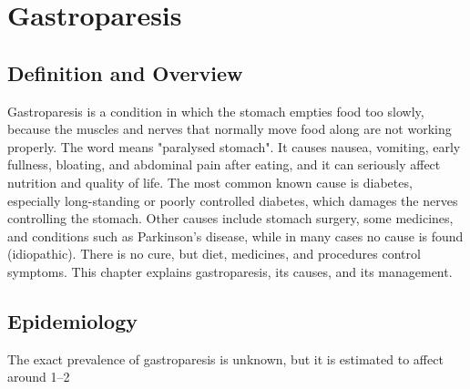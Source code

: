 \chapter{Gastroparesis}

\section*{Definition and Overview}
Gastroparesis is a condition in which the stomach empties food too slowly, because the muscles and nerves that normally move food along are not working properly. The word means "paralysed stomach". It causes nausea, vomiting, early fullness, bloating, and abdominal pain after eating, and it can seriously affect nutrition and quality of life. The most common known cause is diabetes, especially long-standing or poorly controlled diabetes, which damages the nerves controlling the stomach. Other causes include stomach surgery, some medicines, and conditions such as Parkinson's disease, while in many cases no cause is found (idiopathic). There is no cure, but diet, medicines, and procedures control symptoms. This chapter explains gastroparesis, its causes, and its management.

\section*{Epidemiology}
The exact prevalence of gastroparesis is unknown, but it is estimated to affect around 1--2%

